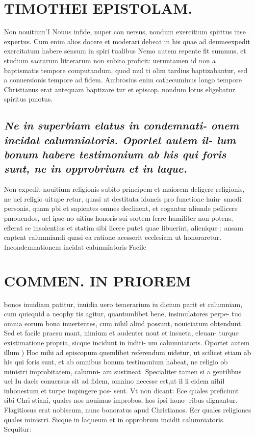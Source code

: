 \documentclass{article}
\begin{document}
\begin{pages}
\section*{TIMOTHEI EPISTOLAM. }
\marginpar{[ p.79 ]}\pstart Non nouitium'I Nouus infide, nuper con uersus, nondum exercitium spiritus inse expertus. Cum enim alios docere et moderari debeat in his quae ad deumeexpedit exercitatum habere sensum in spiri tualibus Nemo autem repente fit summus, et studium sacrarum litterarum non subito proficit: ueruntamen id non a baptismatis tempore computandum, quod mul ti olim tardius baptizabantur, sed a conuersionis tempore ad fidem. Ambrosius enim cathecuminus longo tempore Christianus erat antequam baptizare tur et episcop. nondum lotus eligebatur spiritus pmotus.  \pend
{}
{}
\subsection*{\textit{Ne in superbiam elatus in condemnati- onem incidat calumniatoris. Oportet autem il- lum bonum habere testimonium ab his qui foris sunt, ne in opprobrium et in laque. }}\pstart Non expedit nouitium religionis subito principem et maiorem deligere religionis, ne uel religio uitupe retur, quasi ut destituta idoneis pro functione huiu- smodi personis, quam pbi et sapientes omnes declinent, et cogantur aliunde pellicere pmouendos, uel ipse no uitius honoris sui sortem ferre humiliter non potens, efferat se insolentius et statim sibi licere putet quae libuerint, alienique ; ansam captent calumniandi quasi ea ratione acesserit ecclesiam ut honoraretur.  \pend\pstart Incondemnationem incidat calumniatoris Facile  \pend
\section*{COMMEN. IN PRIOREM }
\marginpar{[ p.80 ]}\pstart bonos inuidiam patitur, inuidia uero temerarium iu dicium parit et calumniam, cum quicquid a neophy tis agitur, quantumlibet bene, insimulatores perpe- tuo omnia eorum bona inuertentes, cum nihil aliud possunt, nouiciatum obtendunt. Sed et facile praesu mant, nimium et audenter nout et insueta, eleuan- turque existimatione propria, sicque incidunt in iuditi- um calumniatoris.  \pend\pstart Oportet autem illum ) Hoc mihi ad episcopum quemlibet referendum uidetur, ut scilicet etiam ab his qui foris sunt, et ab omnibus bonum testimonium habeat, ne religio ob ministri improbitatem, calumni- am sustineat. Specialiter tamen si a gentilibus uel Iu daeis conuersus sit ad fidem, omnino necesse est,ut il li eidem nihil inhonestum et turpe impingere pos- sent. Vt non dicant: Ece quales preficiunt sibi Chri stiani, quales nos nouimus improbos, hos ipsi hono- ribus dignantur. Flagitiosus erat nobiscum, nunc bonoratus apud Christianos. Ecr quales religiones quales ministri. Sicque in laqueum et in opprobrum incidit calumniatoris. Sequitur:  \pend
{}
{}

\end{pages}
\end{document}
